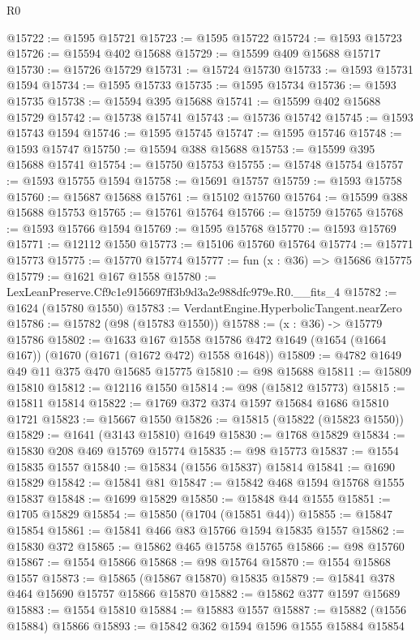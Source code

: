 \begin{lexlean}{R0}
\begin{coremodule}
@15722 := @1595 @15721
@15723 := @1595 @15722
@15724 := @1593 @15723
@15726 := @15594 @402 @15688
@15729 := @15599 @409 @15688 @15717
@15730 := @15726 @15729
@15731 := @15724 @15730
@15733 := @1593 @15731 @1594
@15734 := @1595 @15733
@15735 := @1595 @15734
@15736 := @1593 @15735
@15738 := @15594 @395 @15688
@15741 := @15599 @402 @15688 @15729
@15742 := @15738 @15741
@15743 := @15736 @15742
@15745 := @1593 @15743 @1594
@15746 := @1595 @15745
@15747 := @1595 @15746
@15748 := @1593 @15747
@15750 := @15594 @388 @15688
@15753 := @15599 @395 @15688 @15741
@15754 := @15750 @15753
@15755 := @15748 @15754
@15757 := @1593 @15755 @1594
@15758 := @15691 @15757
@15759 := @1593 @15758
@15760 := @15687 @15688
@15761 := @15102 @15760
@15764 := @15599 @388 @15688 @15753
@15765 := @15761 @15764
@15766 := @15759 @15765
@15768 := @1593 @15766 @1594
@15769 := @1595 @15768
@15770 := @1593 @15769
@15771 := @12112 @1550
@15773 := @15106 @15760 @15764
@15774 := @15771 @15773
@15775 := @15770 @15774
@15777 := fun (x : @36) => @15686 @15775
@15779 := @1621 @167 @1558
@15780 := LexLeanPreserve.Cf9c1e9156697ff3b9d3a2e988dfc979e.R0.__fits_4
@15782 := @1624 (@15780 @1550)
@15783 := VerdantEngine.HyperbolicTangent.nearZero
@15786 := @15782 (@98 (@15783 @1550))
@15788 := (x : @36) -> @15779 @15786
@15802 := @1633
    @167
    @1558
    @15786
    @472
    @1649
    (@1654 (@1664 @167))
    (@1670 (@1671 (@1672 @472) @1558 @1648))
@15809 := @4782 @1649 @49 @11 @375 @470 @15685 @15775
@15810 := @98 @15688
@15811 := @15809 @15810
@15812 := @12116 @1550
@15814 := @98 (@15812 @15773)
@15815 := @15811 @15814
@15822 := @1769 @372 @374 @1597 @15684 @1686 @15810 @1721
@15823 := @15667 @1550
@15826 := @15815 (@15822 (@15823 @1550))
@15829 := @1641 (@3143 @15810) @1649
@15830 := @1768 @15829
@15834 := @15830 @208 @469 @15769 @15774
@15835 := @98 @15773
@15837 := @1554 @15835 @1557
@15840 := @15834 (@1556 @15837) @15814
@15841 := @1690 @15829
@15842 := @15841 @81
@15847 := @15842 @468 @1594 @15768 @1555 @15837
@15848 := @1699 @15829
@15850 := @15848 @44 @1555
@15851 := @1705 @15829
@15854 := @15850 (@1704 (@15851 @44))
@15855 := @15847 @15854
@15861 := @15841 @466 @83 @15766 @1594 @15835 @1557
@15862 := @15830 @372
@15865 := @15862 @465 @15758 @15765
@15866 := @98 @15760
@15867 := @1554 @15866
@15868 := @98 @15764
@15870 := @1554 @15868 @1557
@15873 := @15865 (@15867 @15870) @15835
@15879 := @15841 @378 @464 @15690 @15757 @15866 @15870
@15882 := @15862 @377 @1597 @15689
@15883 := @1554 @15810
@15884 := @15883 @1557
@15887 := @15882 (@1556 @15884) @15866
@15893 := @15842 @362 @1594 @1596 @1555 @15884 @15854

\end{coremodule}
\end{lexlean}
